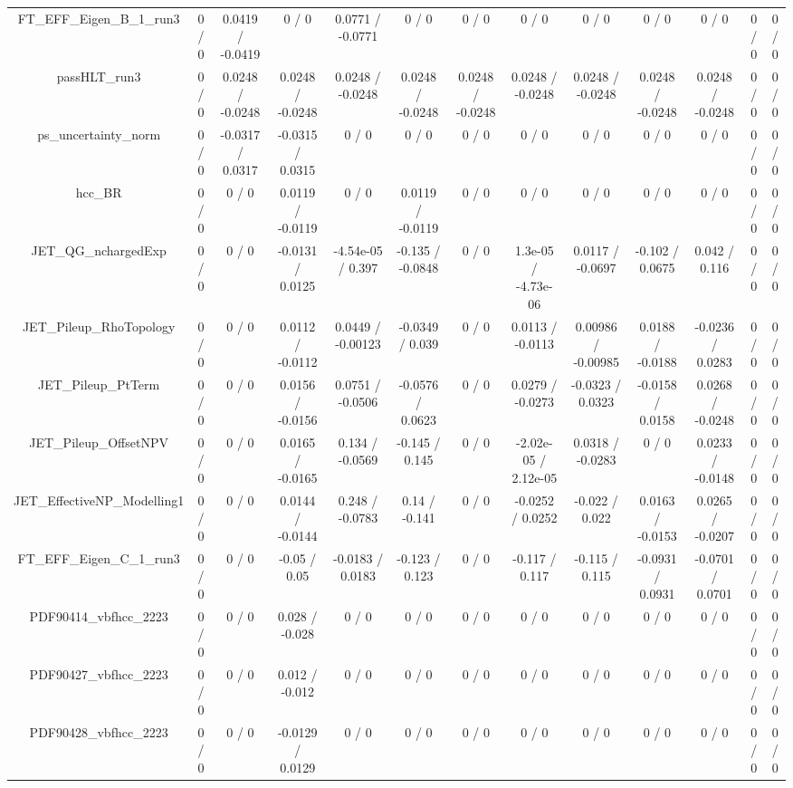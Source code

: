\documentclass[10pt]{article}
\begin{document}
\begin{table}[htbp]
\begin{center}
\begin{tabular}{|c|c|c|c|c|c|c|c|c|c|c|c|c|}
  FT_EFF_Eigen_B_1_run3 & 0 / 0 & 0.0419 / -0.0419 & 0 / 0 & 0.0771 / -0.0771 & 0 / 0 & 0 / 0 & 0 / 0 & 0 / 0 & 0 / 0 & 0 / 0 & 0 / 0 & 0 / 0 \\ 
  passHLT_run3 & 0 / 0 & 0.0248 / -0.0248 & 0.0248 / -0.0248 & 0.0248 / -0.0248 & 0.0248 / -0.0248 & 0.0248 / -0.0248 & 0.0248 / -0.0248 & 0.0248 / -0.0248 & 0.0248 / -0.0248 & 0.0248 / -0.0248 & 0 / 0 & 0 / 0 \\ 
  ps_uncertainty_norm & 0 / 0 & -0.0317 / 0.0317 & -0.0315 / 0.0315 & 0 / 0 & 0 / 0 & 0 / 0 & 0 / 0 & 0 / 0 & 0 / 0 & 0 / 0 & 0 / 0 & 0 / 0 \\ 
  hcc_BR & 0 / 0 & 0 / 0 & 0.0119 / -0.0119 & 0 / 0 & 0.0119 / -0.0119 & 0 / 0 & 0 / 0 & 0 / 0 & 0 / 0 & 0 / 0 & 0 / 0 & 0 / 0 \\ 
  JET_QG_nchargedExp & 0 / 0 & 0 / 0 & -0.0131 / 0.0125 & -4.54e-05 / 0.397 & -0.135 / -0.0848 & 0 / 0 & 1.3e-05 / -4.73e-06 & 0.0117 / -0.0697 & -0.102 / 0.0675 & 0.042 / 0.116 & 0 / 0 & 0 / 0 \\ 
  JET_Pileup_RhoTopology & 0 / 0 & 0 / 0 & 0.0112 / -0.0112 & 0.0449 / -0.00123 & -0.0349 / 0.039 & 0 / 0 & 0.0113 / -0.0113 & 0.00986 / -0.00985 & 0.0188 / -0.0188 & -0.0236 / 0.0283 & 0 / 0 & 0 / 0 \\ 
  JET_Pileup_PtTerm & 0 / 0 & 0 / 0 & 0.0156 / -0.0156 & 0.0751 / -0.0506 & -0.0576 / 0.0623 & 0 / 0 & 0.0279 / -0.0273 & -0.0323 / 0.0323 & -0.0158 / 0.0158 & 0.0268 / -0.0248 & 0 / 0 & 0 / 0 \\ 
  JET_Pileup_OffsetNPV & 0 / 0 & 0 / 0 & 0.0165 / -0.0165 & 0.134 / -0.0569 & -0.145 / 0.145 & 0 / 0 & -2.02e-05 / 2.12e-05 & 0.0318 / -0.0283 & 0 / 0 & 0.0233 / -0.0148 & 0 / 0 & 0 / 0 \\ 
  JET_EffectiveNP_Modelling1 & 0 / 0 & 0 / 0 & 0.0144 / -0.0144 & 0.248 / -0.0783 & 0.14 / -0.141 & 0 / 0 & -0.0252 / 0.0252 & -0.022 / 0.022 & 0.0163 / -0.0153 & 0.0265 / -0.0207 & 0 / 0 & 0 / 0 \\ 
  FT_EFF_Eigen_C_1_run3 & 0 / 0 & 0 / 0 & -0.05 / 0.05 & -0.0183 / 0.0183 & -0.123 / 0.123 & 0 / 0 & -0.117 / 0.117 & -0.115 / 0.115 & -0.0931 / 0.0931 & -0.0701 / 0.0701 & 0 / 0 & 0 / 0 \\ 
  PDF90414_vbfhcc_2223 & 0 / 0 & 0 / 0 & 0.028 / -0.028 & 0 / 0 & 0 / 0 & 0 / 0 & 0 / 0 & 0 / 0 & 0 / 0 & 0 / 0 & 0 / 0 & 0 / 0 \\ 
  PDF90427_vbfhcc_2223 & 0 / 0 & 0 / 0 & 0.012 / -0.012 & 0 / 0 & 0 / 0 & 0 / 0 & 0 / 0 & 0 / 0 & 0 / 0 & 0 / 0 & 0 / 0 & 0 / 0 \\ 
  PDF90428_vbfhcc_2223 & 0 / 0 & 0 / 0 & -0.0129 / 0.0129 & 0 / 0 & 0 / 0 & 0 / 0 & 0 / 0 & 0 / 0 & 0 / 0 & 0 / 0 & 0 / 0 & 0 / 0 \\ 

\end{tabular}
\end{center}
\end{table}
\end{document}
